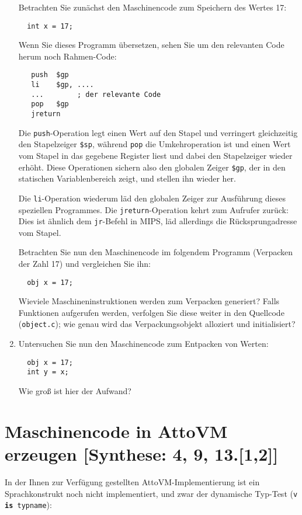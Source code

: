 \documentclass[11pt,a4paper]{article}
\begin{document}
\begin{enumerate}
    Betrachten Sie zunächst den Maschinencode zum Speichern des Wertes 17:
\begin{verbatim}
  int x = 17;
\end{verbatim}

   Wenn Sie dieses Programm übersetzen, sehen Sie um den relevanten Code herum noch Rahmen-Code:
\begin{verbatim}
   push  $gp
   li    $gp, ....
   ...        ; der relevante Code
   pop   $gp
   jreturn
\end{verbatim}

   Die \texttt{push}-Operation legt einen Wert auf den Stapel und verringert gleichzeitig den Stapelzeiger \texttt{\$sp}, während
\texttt{pop} die Umkehroperation ist und einen Wert vom Stapel in das gegebene Register liest und dabei den Stapelzeiger wieder erhöht.
Diese Operationen sichern also den globalen Zeiger \texttt{\$gp}, der in den statischen Variablenbereich zeigt, und stellen ihn wieder her.

Die \texttt{li}-Operation wiederum läd den globalen Zeiger zur Ausführung dieses speziellen Programmes.
Die \texttt{jreturn}-Operation kehrt zum Aufrufer zurück:  Dies ist ähnlich dem \texttt{jr}-Befehl in MIPS, läd allerdings die Rücksprungadresse
vom Stapel.

    Betrachten Sie nun
    den Maschinencode im folgendem Programm (Verpacken der Zahl 17) und vergleichen Sie ihn:
\begin{verbatim}
  obj x = 17;
\end{verbatim}

  Wieviele Maschineninstruktionen werden zum Verpacken generiert?  Falls Funktionen aufgerufen werden, verfolgen Sie diese weiter in
den Quellcode (\texttt{object.c}); wie genau wird das Verpackungsobjekt alloziert und initialisiert?

  \item 
    Untersuchen Sie nun den Maschinencode zum Entpacken von Werten:

\begin{verbatim}
  obj x = 17;
  int y = x;
\end{verbatim}

   Wie groß ist hier der Aufwand?

\end{enumerate}

\section{Maschinencode in AttoVM erzeugen [Synthese: 4, 9, 13.[1,2]]}
In der Ihnen zur Verfügung gestellten AttoVM-Implementierung ist ein Sprachkonstrukt noch nicht implementiert,
und zwar der dynamische Typ-Test (\texttt{v \textbf{is} typname}):
\end{document}

